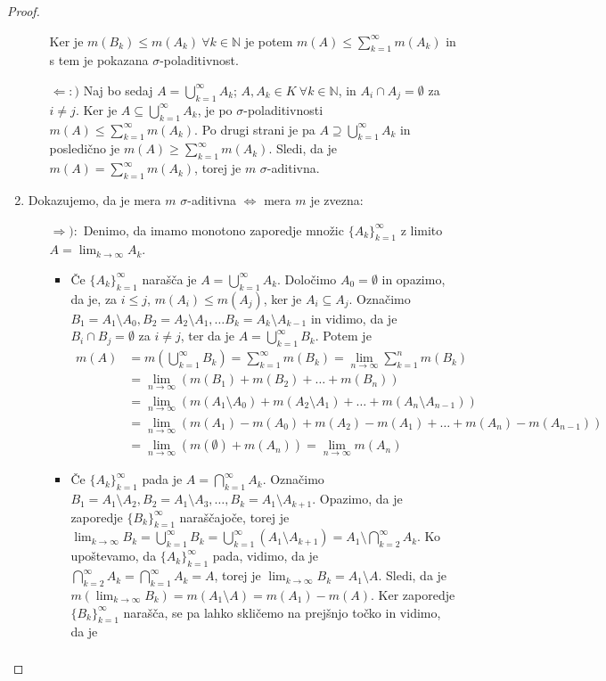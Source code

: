 \documentclass[a4paper, 10pt]{article}
\newcommand{\mth}[1]{\ensuremath{\mathbb{#1}}}
\newcommand{\N}{\mth{N}}
\begin{document}
\begin{proof}
\begin{enumerate}
\begin{itemize}
					Ker je $m(B_k) \leq m(A_k)~\forall k\in\N$ je potem $m(A) \leq \sum_{k = 1}^\infty m(A_k)$ in s tem je pokazana $\sigma$-poladitivnost.
					\item[$\Leftarrow:)$] Naj bo sedaj $A = \bigcup_{k = 1}^\infty A_k$; $A, A_k\in K~\forall k\in\N$, in $A_i\cap A_j =\emptyset$ za $i\neq j$. Ker je $A \subseteq \bigcup_{k = 1}^\infty A_k$, je po $\sigma$-poladitivnosti $m(A) \leq \sum_{k = 1}^\infty m(A_k)$. Po drugi strani je pa $A \supseteq \bigcup_{k = 1}^\infty A_k$ in posledično je $m(A) \geq \sum_{k = 1}^\infty m(A_k)$. Sledi, da je $m(A) = \sum_{k = 1}^\infty m(A_k)$, torej je $m$ $\sigma$-aditivna.
				\end{itemize}
				\item Dokazujemo, da je mera $m$ $\sigma$-aditivna $\iff$ mera $m$ je zvezna: \begin{itemize}
					\item[$\Rightarrow):$] Denimo, da imamo monotono zaporedje množic $\{A_k\}_{k = 1}^\infty$ z limito $A = \lim_{k\to\infty}A_k$. \begin{itemize}
						\item Če $\{A_k\}_{k = 1}^\infty$ narašča je $A = \bigcup_{k = 1}^\infty A_k$. Določimo $A_0 = \emptyset$ in opazimo, da je, za $i \leq j$, $m(A_i)\leq m(A_j)$, ker je $A_i \subseteq A_j$. Označimo $B_1 = A_1\setminus A_0, B_2 = A_2 \setminus A_1, \ldots B_k = A_k \setminus A_{k-1}$ in vidimo, da je $B_i\cap B_j = \emptyset$ za $i\neq j$, ter da je $A = \bigcup_{k = 1}^\infty B_k$. Potem je \begin{align*}
							m(A) &= m(\bigcup_{k = 1}^\infty B_k) = \sum_{k = 1}^\infty m(B_k) = \lim_{n\to\infty}\sum_{k = 1}^n m(B_k) \\
							&= \lim_{n\to\infty}(m(B_1) + m(B_2) + \ldots + m(B_n)) \\ 
							&= \lim_{n\to\infty}(m(A_1\setminus A_0) + m(A_2\setminus A_1) + \ldots + m(A_n\setminus A_{n-1})) \\
							&= \lim_{n\to\infty}(m(A_1) - m(A_0) + m(A_2) - m(A_1) + \ldots + m(A_n) - m(A_{n-1})) \\
							&= \lim_{n\to\infty}(m(\emptyset) + m(A_n)) = \lim_{n\to\infty}m(A_n)
						\end{align*}
						\item Če $\{A_k\}_{k = 1}^\infty$ pada je $A = \bigcap_{k = 1}^\infty A_k$. Označimo $B_1 = A_1 \setminus A_2, B_2 = A_1 \setminus A_3, \ldots, B_k = A_1 \setminus A_{k+1}$. Opazimo, da je zaporedje $\{B_k\}_{k = 1}^\infty$ naraščajoče, torej je $\lim_{k\to\infty}B_k = \bigcup_{k = 1}^\infty B_k = \bigcup_{k = 1}^\infty (A_1 \setminus A_{k+1}) = A_1 \setminus \bigcap_{k = 2}^\infty A_{k}$. Ko upoštevamo, da $\{A_k\}_{k=1}^\infty$ pada, vidimo, da je $\bigcap_{k = 2}^\infty A_{k} = \bigcap_{k = 1}^\infty A_{k} = A$, torej je $\lim_{k\to\infty} B_k = A_1\setminus A$. Sledi, da je \underline{$m(\lim_{k\to\infty}B_k) = m(A_1 \setminus A) = m(A_1) - m(A)$}. Ker zaporedje $\{B_k\}_{k = 1}^\infty$ narašča, se pa lahko skličemo na prejšnjo točko in vidimo, da je \begin{align*}

\end{align*}
\end{itemize}
\end{itemize}
\end{enumerate}
\end{proof}
\end{document}
